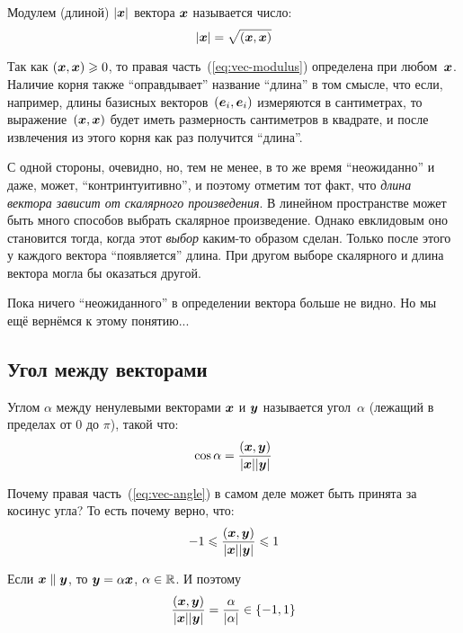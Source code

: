 \documentclass[a4paper,12pt]{article}
\begin{document}
  \begin{definition}
    Модулем (длиной) $|\boldsymbol x|$ вектора $\boldsymbol x$ называется число:
    \begin{equation}\label{eq:vec-modulus}
      |\boldsymbol x| = \sqrt{(\boldsymbol x, \boldsymbol x)}
    \end{equation}
  \end{definition}
  
  Так как $(\bds x, \bds x) \hm\geq 0$, то правая часть~(\ref{eq:vec-modulus}) определена при любом~$\boldsymbol x$.
  Наличие корня также ``оправдывает'' название ``длина'' в том смысле, что если, например, длины базисных векторов~$(\boldsymbol e_i, \boldsymbol e_i)$ измеряются в сантиметрах, то выражение~$(\boldsymbol x, \boldsymbol x)$ будет иметь размерность сантиметров в квадрате, и после извлечения из этого корня как раз получится ``длина''.
  
  С одной стороны, очевидно, но, тем не менее, в то же время ``неожиданно'' и даже, может, ``контринтуитивно'', и поэтому отметим тот факт, что \emph{длина вектора зависит от скалярного произведения}.
  В линейном пространстве может быть много способов выбрать скалярное произведение.
  Однако евклидовым оно становится тогда, когда этот \emph{выбор} каким-то образом сделан.
  Только после этого у каждого вектора ``появляется'' длина.
  При другом выборе скалярного и длина вектора могла бы оказаться другой.
  
  Пока ничего ``неожиданного'' в определении вектора больше не видно.
  Но мы ещё вернёмся к этому понятию...
  
  
  \subsection{Угол между векторами}
  
  \begin{definition}
    Углом $\alpha$ между ненулевыми векторами $\boldsymbol x$ и $\boldsymbol y$ называется угол~$\alpha$ (лежащий в пределах от $0$ до $\pi$), такой что:
    \begin{equation}\label{eq:vec-angle}
      \cos\alpha = \frac{(\boldsymbol x, \boldsymbol y)}{|\boldsymbol x| |\boldsymbol y|}
    \end{equation}
  \end{definition}
  
  Почему правая часть~(\ref{eq:vec-angle}) в самом деле может быть принята за косинус угла?
  То есть почему верно, что:
  \[
    -1 \leqslant \frac{(\boldsymbol x, \boldsymbol y)}{|\boldsymbol x| |\boldsymbol y|} \leqslant 1
  \]
  
  Если $\bds x \hm\parallel \bds y$, то $\bds y \hm= \alpha \bds x$, $\alpha \hm\in \RR$.
  И поэтому
  \[
    \frac{(\boldsymbol x, \boldsymbol y)}{|\boldsymbol x| |\boldsymbol y|} = \frac{\alpha}{|\alpha|} \in \{-1, 1\}
  \]
  
\end{document}

